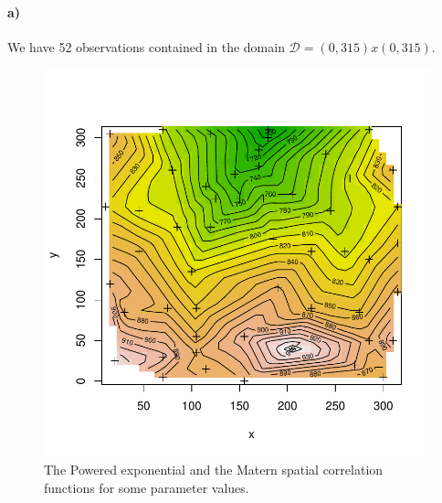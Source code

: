 \paragraph{a)}
We have 52 observations contained in the domain $\mathcal{D} = (0,315)x(0,315)$.


\begin{figure}[htb]
    \centering
    \includegraphics{figures/terrain2a.pdf}
    \caption{The Powered exponential and the Matern spatial correlation functions for some parameter values.}
    \label{fig:corrfunc}
\end{figure}


